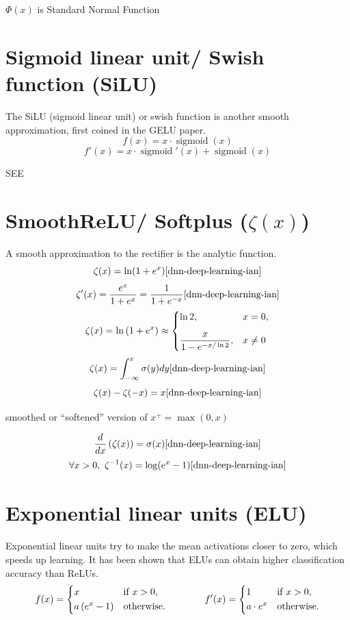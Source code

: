 $\Phi (x)$ is Standard Normal Function


\section{Sigmoid linear unit/ Swish function (SiLU)}\label{Sigmoid linear unit/ Swish function (SiLU)}
The SiLU (sigmoid linear unit) or swish function is another smooth approximation, first coined in the GELU paper.
\[
    f(x)=x\cdot \operatorname {sigmoid} (x)
\]
\[
    f'(x)=x\cdot \operatorname {sigmoid} '(x)+\operatorname {sigmoid} (x)
\]

SEE 

\section{SmoothReLU/ Softplus ($\zeta(x)$) \cite{wiki-Rectifier}}\label{SmoothReLU/ Softplus}
A smooth approximation to the rectifier is the analytic function.
\[ 
    \zeta(x)=\ln(1+e^{x}) 
    \hfill\text{\cite{dnn-deep-learning-ian}}
\]
\[
    \zeta'(x)
    ={\dfrac {e^{x}}{1+e^{x}}}={\displaystyle \dfrac {1}{1+e^{-x}}} 
    \hfill\text{\cite{dnn-deep-learning-ian}}
\]
\[ 
    \zeta(x)
    =\ln \left(1+e^{x}\right)
    \approx {\begin{dcases}\ln 2,&x=0,\\[6pt]{\displaystyle \dfrac {x}{1-e^{-x/\ln 2}}},&x\neq 0\end{dcases}} 
\]
\[
    \zeta(x)
    = \dint_{-\infty}^{x} \sigma(y)dy
    \hfill\text{\cite{dnn-deep-learning-ian}}
\]
\[
    \zeta(x) - \zeta(-x) = x
    \hfill\text{\cite{dnn-deep-learning-ian}}
\]

smoothed or “softened” version of $x^+ = \max(0,x)$

\[
    \dfrac{d}{dx}\dParenBrac{\zeta(x)}
    = \sigma(x)
    \hfill\text{\cite{dnn-deep-learning-ian}}
\]
\[
    \forall x > 0,\ 
    \zeta^{-1}(x) = \log(e^x-1)
    \hfill\text{\cite{dnn-deep-learning-ian}}
\]

\section{Exponential linear units (ELU) \cite{wiki-Rectifier}}\label{Exponential linear units (ELU)}
Exponential linear units try to make the mean activations closer to zero, which speeds up learning. It has been shown that ELUs can obtain higher classification accuracy than ReLUs.
\[
    {\displaystyle f(x)={\begin{dcases}x&{\text{if }}x>0,\\a\left(e^{x}-1\right)&{\text{otherwise}}.\end{dcases}}\qquad \qquad f'(x)={\begin{dcases}1&{\text{if }}x>0,\\a\cdot e^{x}&{\text{otherwise}}.\end{dcases}}}
\]

